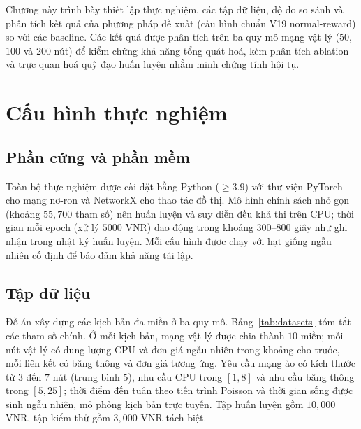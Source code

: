 \documentclass[../DoAn.tex]{subfiles}
\begin{document}
\label{ch:thuc_nghiem}

Chương này trình bày thiết lập thực nghiệm, các tập dữ liệu, độ đo so sánh và phân tích kết quả của phương pháp đề xuất (cấu hình chuẩn V19 normal-reward) so với các baseline. Các kết quả được phân tích trên ba quy mô mạng vật lý ($50$, $100$ và $200$ nút) để kiểm chứng khả năng tổng quát hoá, kèm phân tích ablation và trực quan hoá quỹ đạo huấn luyện nhằm minh chứng tính hội tụ.

\section{Cấu hình thực nghiệm}              %
\label{sec:exp-setup}

\subsection{Phần cứng và phần mềm}
\label{subsec:exp-hw}

Toàn bộ thực nghiệm được cài đặt bằng Python ($\ge 3.9$) với thư viện PyTorch cho mạng nơ-ron và NetworkX cho thao tác đồ thị. Mô hình chính sách nhỏ gọn (khoảng $55{,}700$ tham số) nên huấn luyện và suy diễn đều khả thi trên CPU; thời gian mỗi epoch (xử lý $5000$ VNR) dao động trong khoảng $300$–$800$ giây như ghi nhận trong nhật ký huấn luyện. Mỗi cấu hình được chạy với hạt giống ngẫu nhiên cố định để bảo đảm khả năng tái lập.

\subsection{Tập dữ liệu}
\label{subsec:exp-data}

Đồ án xây dựng các kịch bản đa miền ở ba quy mô. Bảng~\ref{tab:datasets} tóm tắt các tham số chính. Ở mỗi kịch bản, mạng vật lý được chia thành $10$ miền; mỗi nút vật lý có dung lượng CPU và đơn giá ngẫu nhiên trong khoảng cho trước, mỗi liên kết có băng thông và đơn giá tương ứng. Yêu cầu mạng ảo có kích thước từ $3$ đến $7$ nút (trung bình $5$), nhu cầu CPU trong $[1, 8]$ và nhu cầu băng thông trong $[5, 25]$; thời điểm đến tuân theo tiến trình Poisson và thời gian sống được sinh ngẫu nhiên, mô phỏng kịch bản trực tuyến. Tập huấn luyện gồm $10{,}000$ VNR, tập kiểm thử gồm $3{,}000$ VNR tách biệt.
\end{document}
